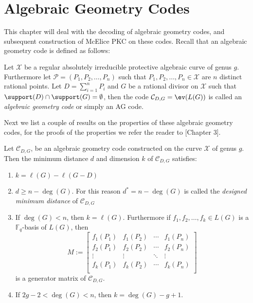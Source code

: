 \chapter{Algebraic Geometry Codes}
This chapter will deal with the decoding of algebraic geometry codes, and subsequent construction of McElice PKC on these codes. Recall that an algebraic geometry code is defined as follows:
\begin{definition}
Let $\mathcal{X}$ be a regular absolutely irreducible protective algebraic curve of genus $g$. Furthermore let $\mathcal{P}=\left(P_1, P_2, \ldots, P_{n}\right)$ such that $P_1, P_2, \ldots, P_{n} \in \mathcal{X}$ are $n$ distinct rational points. Let $D = \sum_{i = 1}^n P_{i}$ and $G$ be a rational divisor on $\mathcal{X}$ such that $\support (D) \cap \support(G) = \emptyset$, then the code $\mathcal{C}_{D, G} = \ev(L(G))$ is called an \textit{algebraic geometry code} or simply an AG code.
\end{definition}
Next we list a couple of results on the properties of these algebraic geometry codes, for the proofs of the properties we refer the reader to \cite{bachellor}[Chapter 3].
\begin{theorem}\label{thm:ag_codes_properties}
  Let $\mathcal{C}_{D, G}$, be an algebraic geometry code constructed on the curve $\mathcal{X}$ of genus $g$. Then the minimum distance $d$ and dimension $k$ of $\mathcal{C}_{D, G}$ satisfies:
  \begin{enumerate}
    \item $k = \ell(G) - \ell(G - D)$ \label{thm:ag_codes_properties1}
    \item $d \geq n - \deg(G)$. For this reason $d^{*} = n - \deg(G)$ is called the \textit{designed minimum distance} of $\mathcal{C}_{D, G}$ \label{thm:ag_codes_properties2}
    \item If $\deg(G) < n$, then $k = \ell(G)$. Furthermore if $f_1, f_2, \ldots, f_{k} \in L(G)$ is a $\mathbb{F}_q$-basis of $L(G)$, then
          \begin{equation*}
            M := \begin{bmatrix}
                    f_1(P_1) & f_1(P_2) & \cdots & f_1(P_{n}) \\
                    f_2(P_1) & f_2(P_2) & \cdots & f_2(P_{n}) \\
                    \vdots & \vdots & \ddots & \vdots \\
                    f_k(P_1) & f_k(P_2) & \cdots & f_k(P_{n}) \\
                 \end{bmatrix}
          \end{equation*}
          is a generator matrix of $\mathcal{C}_{D, G}$.\label{thm:ag_codes_properties3}
    \item If $2g - 2 < \deg(G) < n$, then $k = \deg(G) - g + 1$.\label{thm:ag_codes_properties4}
  \end{enumerate}
\end{theorem}

